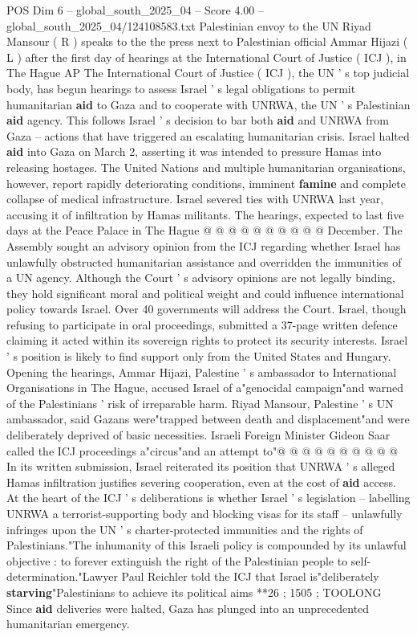 \begin{textsample}{POS Dim 6 – global\_south\_2025\_04 – Score 4.00 – global\_south\_2025\_04/124108583.txt}  \label{ex:f6_pos_235}
Palestinian envoy to the UN Riyad Mansour ( R ) speaks to the the press next to Palestinian official Ammar Hijazi ( L ) after the first day of hearings at the International Court of Justice ( ICJ ), in The Hague AP The International Court of Justice ( ICJ ), the UN ' s top judicial body, has begun hearings to assess Israel ' s legal obligations to permit humanitarian \textbf{aid} to Gaza and to cooperate with UNRWA, the UN ' s Palestinian \textbf{aid} agency.
This follows Israel ' s decision to bar both \textbf{aid} and UNRWA from Gaza -- actions that have triggered an escalating humanitarian crisis.
Israel halted \textbf{aid} into Gaza on March 2, asserting it was intended to pressure Hamas into releasing hostages.
The United Nations and multiple humanitarian organisations, however, report rapidly deteriorating conditions, imminent \textbf{famine} and complete collapse of medical infrastructure.
Israel severed ties with UNRWA last year, accusing it of infiltration by Hamas militants.
The hearings, expected to last five days at the Peace Palace in The Hague @ @ @ @ @ @ @ @ @ @ December.
The Assembly sought an advisory opinion from the ICJ regarding whether Israel has unlawfully obstructed humanitarian assistance and overridden the immunities of a UN agency.
Although the Court ' s advisory opinions are not legally binding, they hold significant moral and political weight and could influence international policy towards Israel.
Over 40 governments will address the Court.
Israel, though refusing to participate in oral proceedings, submitted a 37-page written defence claiming it acted within its sovereign rights to protect its security interests.
Israel ' s position is likely to find support only from the United States and Hungary.
Opening the hearings, Ammar Hijazi, Palestine ' s ambassador to International Organisations in The Hague, accused Israel of a"genocidal campaign"and warned of the Palestinians ' risk of irreparable harm.
Riyad Mansour, Palestine ' s UN ambassador, said Gazans were"trapped between death and displacement"and were deliberately deprived of basic necessities.
Israeli Foreign Minister Gideon Saar called the ICJ proceedings a"circus"and an attempt to"@ @ @ @ @ @ @ @ @ @ In its written submission, Israel reiterated its position that UNRWA ' s alleged Hamas infiltration justifies severing cooperation, even at the cost of \textbf{aid} access.
At the heart of the ICJ ' s deliberations is whether Israel ' s legislation -- labelling UNRWA a terrorist-supporting body and blocking visas for its staff -- unlawfully infringes upon the UN ' s charter-protected immunities and the rights of Palestinians."The inhumanity of this Israeli policy is compounded by its unlawful objective : to forever extinguish the right of the Palestinian people to self-determination."Lawyer Paul Reichler told the ICJ that Israel is"deliberately \textbf{starving}"Palestinians to achieve its political aims **26 ; 1505 ; TOOLONG Since \textbf{aid} deliveries were halted, Gaza has plunged into an unprecedented humanitarian emergency.

\end{textsample}
